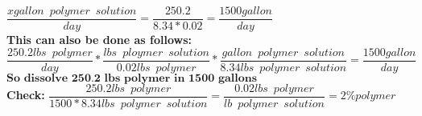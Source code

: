 \documentclass{article}
\begin{document}
\begin{enumerate}
\vspace{0.25cm}
$\dfrac{x gallon \enspace polymer \enspace solution}{day}=\dfrac{250.2}{8.34*0.02}=\boxed{\dfrac{1500 gallon}{day}}$\\
\vspace{0.25cm}
\textbf{This can also be done as follows:}\\
\vspace{0.25cm}
$\dfrac{250.2 lbs \enspace polymer}{day}*\dfrac{lbs \enspace ploymer \enspace solution}{0.02 lbs \enspace polymer}*\dfrac{gallon \enspace polymer \enspace solution}{8.34 lbs \enspace polymer \enspace solution}=\boxed{\dfrac{1500 gallon}{day}}$\\
\vspace{0.25cm}
$\boxed{\textbf{So dissolve 250.2 lbs polymer in 1500 gallons}}$\\
\vspace{0.25cm}
\textbf{Check:}
$\dfrac{250.2lbs \enspace polymer}{1500*8.34 lbs \enspace polymer \enspace solution}=\dfrac{0.02 lbs \enspace polymer}{lb \enspace polymer \enspace solution}=2\% polymer$
\vspace{0.25cm}


\end{enumerate}
\end{document}
